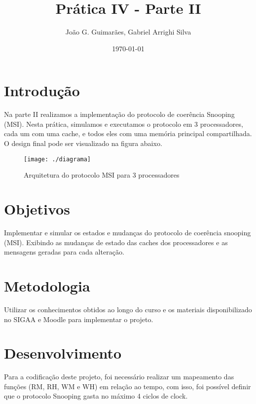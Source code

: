 \documentclass[12pt]{article}
\title{Prática IV - Parte II}
\author{João G. Guimarães, Gabriel Arrighi Silva}
\date{\today}
\begin{document}
 

\maketitle

\section{Introdução}

\par Na parte II realizamos a implementação do protocolo de coerência Snooping (MSI). Nesta prática, simulamos e executamos o protocolo em 3 processadores, cada um com uma cache, e todos eles com uma memória principal compartilhada. O design final pode ser visualizado na figura abaixo.

\vspace{\baselineskip}

\begin{figure}[H]
	\centering
	\texttt{[image: ./diagrama]}
	\caption{Arquitetura do protocolo MSI para 3 processadores}
	\label{fig: protocolo MSI}
\end{figure}

\section{Objetivos}
\par Implementar e simular os estados e mudanças do protocolo de coerência snooping (MSI). Exibindo as mudanças de estado das caches dos processadores e as mensagens geradas para cada alteração.

\section{Metodologia}
\par Utilizar os conhecimentos obtidos ao longo do curso e os materiais disponibilizado no SIGAA e Moodle para implementar o projeto.

\section{Desenvolvimento}

\par Para a codificação deste projeto, foi necessário realizar um mapeamento das funções (RM, RH, WM e WH) em relação ao tempo, com isso, foi possível definir que o protocolo Snooping gasta no máximo 4 ciclos de clock.
\end{document}
